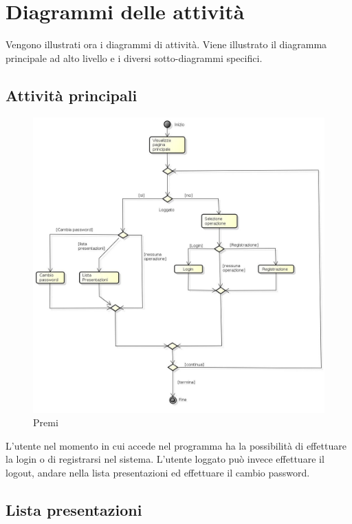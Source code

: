 \section{Diagrammi delle attività}
Vengono illustrati ora i diagrammi di attività. Viene illustrato il diagramma principale ad alto livello e i diversi sotto-diagrammi specifici.

\subsection{Attività principali}

\begin{figure}[h!]
		\centering
		\includegraphics[scale=.2]{img/Premi.jpg}
		\caption{Premi}
		\label{fig:ModelloSpy}
\end{figure}

L'utente nel momento in cui accede nel programma ha la possibilità di effettuare la login o di registrarsi nel sistema. 
L'utente loggato può invece effettuare il logout, andare nella lista presentazioni ed effettuare il cambio password. 

\subsection{Lista presentazioni}


